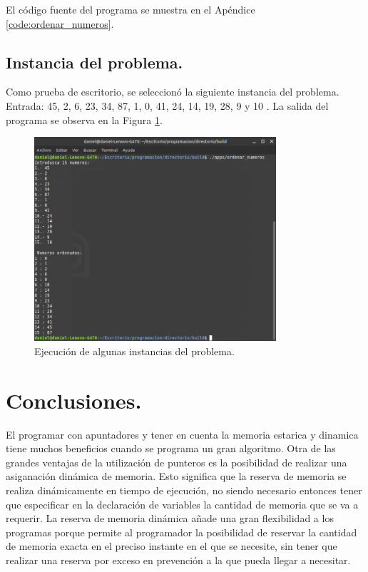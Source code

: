 \documentclass[12pt,letterpaper]{article}
\begin{document}
El código fuente del programa se muestra en el Apéndice \ref{code:ordenar_numeros}.

\subsection{Instancia del problema.}
Como prueba de escritorio, se seleccionó la siguiente instancia del problema. Entrada: 45, 2, 6, 23, 34, 87, 1, 0, 41, 24, 14, 19, 28, 9 y 10 . La salida del programa se observa en la Figura \ref{fig:ordenar_numeros}.
\begin{figure}[ht!]
  \centering
  \includegraphics[width=0.8\textwidth]{figures/ordenar_numeros}
  \caption{Ejecución de algunas instancias del problema.}
  \label{fig:ordenar_numeros}
\end{figure}

\newpage

\section{Conclusiones.}

El programar con apuntadores y tener en cuenta la memoria estarica y dinamica tiene muchos beneficios cuando se programa un gran algoritmo. Otra de las grandes ventajas de la utilizaci\'on de punteros es la posibilidad de realizar una asiganaci\'on din\'amica de memoria. Esto significa que la reserva de memoria se realiza din\'amicamente en tiempo de ejecuci\'on, no siendo necesario entonces tener que especificar en la declaraci\'on de variables la cantidad de memoria que se va a requerir. La reserva de memoria din\'amica añade una gran flexibilidad  a los programas porque permite al programador la posibilidad de reservar la cantidad de memoria exacta en el preciso instante en el que se necesite, sin tener que realizar una reserva por exceso en prevenci\'on a la que pueda llegar a necesitar.
\end{document}
